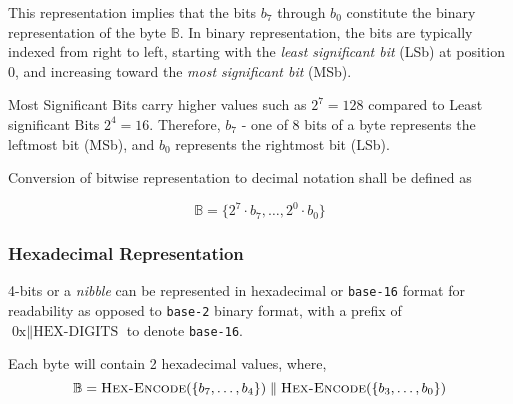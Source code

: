 \documentclass[../alan-handbook.tex]{subfiles}
\begin{document}
This representation implies that the bits $b_7$ through $b_0$ constitute the binary representation of the byte $\mathbb{B}$. In binary representation, the bits are typically indexed from right to left, starting with the \textit{least significant bit} (LSb) at position 0, and increasing toward the \textit{most significant bit} (MSb). 

Most Significant Bits carry higher values such as $2^7=128$ compared to Least significant Bits $2^4=16$. Therefore, $b_7$ - one of 8 bits of a byte represents the leftmost bit (MSb), and $b_0$ represents the rightmost bit (LSb).

Conversion of bitwise representation to decimal notation shall be defined as

$$\mathbb{B} = \{2^7\cdot b_7,\ldots,2^0 \cdot b_0\}$$

\subsubsection{Hexadecimal Representation} \label{HexadecimalRepresentation}

4-bits or a \textit{nibble} can be represented in hexadecimal or \texttt{base-16} format for readability as opposed to \texttt{base-2} binary format, with a prefix of $\text{0x} \parallel \text{HEX-DIGITS}$ to denote \texttt{base-16}.

Each byte will contain 2 hexadecimal values, where,
$$\mathbb{B}=\Call{Hex-Encode}{\{b_7,\ldots,b_4\}} \parallel \Call{Hex-Encode}{\{b_3,\ldots,b_0\}}$$
\begin{table}[h]
\end{table}

\begin{table}[h]
\end{table}
\end{document}
